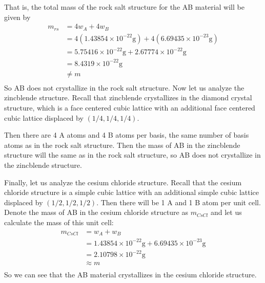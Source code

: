 \documentclass{article}
\begin{document}
That is, the total mass of the rock salt structure for the AB material will be given by
\begin{align*}
    m_{rs} &= 4w_A + 4w_B \\
    &= 4(1.43854 \times 10^{-22} \text{g}) + 4(6.69435 \times 10^{-23} \text{g}) \\
    &= 5.75416 \times 10^{-22} \text{g} + 2.67774 \times 10^{-22} \text{g} \\
    &= 8.4319 \times 10^{-22} \text{g} \\
    &\neq m \\
\end{align*}
So AB does not crystallize in the rock salt structure. Now let us analyze the zincblende structure. 
Recall that zincblende crystallizes in the diamond crystal structure, which is a face centered cubic lattice with an additional face centered cubic lattice displaced by $(1/4,1/4,1/4)$. 

Then there are 4 A atoms and 4 B atoms per basis, the same number of basis atoms as in the rock salt structure. 
Then the mass of AB in the zincblende structure will the same as in the rock salt structure, so AB does not crystallize in the zincblende structure.

Finally, let us analyze the cesium chloride structure. Recall that the cesium chloride structure is a simple cubic lattice with an additional simple cubic lattice displaced by $(1/2,1/2,1/2)$.
Then there will be 1 A and 1 B atom per unit cell. Denote the mass of AB in the cesium chloride structure as $m_{CsCl}$ and let us calculate the mass of this unit cell:
\begin{align*}
    m_{CsCl} &= w_A + w_B \\
    &= 1.43854 \times 10^{-22} \text{g} + 6.69435 \times 10^{-23} \text{g} \\
    &= 2.10798 \times 10^{-22} \text{g} \\
    &\approx m \\
\end{align*}
So we can see that the AB material crystallizes in the cesium chloride structure.
\newline
\end{document}
